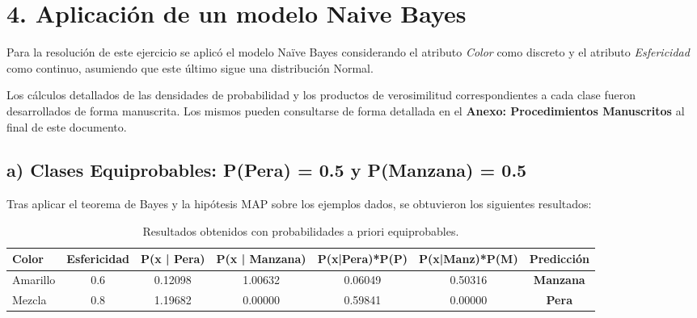 \documentclass[11pt,a4paper]{article}
\begin{document}


\section*{4. Aplicación de un modelo Naive Bayes}

Para la resolución de este ejercicio se aplicó el modelo Naïve Bayes considerando el atributo \textit{Color} como discreto y el atributo \textit{Esfericidad} como continuo, asumiendo que este último sigue una distribución Normal. 

Los cálculos detallados de las densidades de probabilidad y los productos de verosimilitud correspondientes a cada clase fueron desarrollados de forma manuscrita. Los mismos pueden consultarse de forma detallada en el \textbf{Anexo: Procedimientos Manuscritos} al final de este documento.

\subsection*{a) Clases Equiprobables: P(Pera) = 0.5 y P(Manzana) = 0.5}

Tras aplicar el teorema de Bayes y la hipótesis MAP sobre los ejemplos dados, se obtuvieron los siguientes resultados:

\begin{table}[H]
\centering
\begin{adjustbox}{width=\textwidth}
\begin{tabular}{|l|c|c|c|c|c|c|}
\hline
\textbf{Color} & \textbf{Esfericidad} & \textbf{P(x | Pera)} & \textbf{P(x | Manzana)} & \textbf{P(x|Pera)*P(P)} & \textbf{P(x|Manz)*P(M)} & \textbf{Predicción} \\ \hline
Amarillo & 0.6 & 0.12098 & 1.00632 & 0.06049 & 0.50316 & \textbf{Manzana} \\ \hline
Mezcla & 0.8 & 1.19682 & 0.00000 & 0.59841 & 0.00000 & \textbf{Pera} \\ \hline
\end{tabular}
\end{adjustbox}
\caption{Resultados obtenidos con probabilidades a priori equiprobables.}
\end{table}
\end{document}
